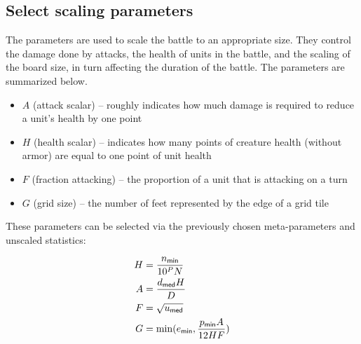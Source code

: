 \subsection{Select scaling parameters}

The parameters are used to scale the battle to an appropriate size.
They control the damage done by attacks,
the health of units in the battle,
and the scaling of the board size,
in turn affecting the duration of the battle.
The parameters are summarized below.

\begin{itemize}
    \item $A$ (attack scalar) -- roughly indicates how much damage is required to reduce a unit's health by one point
    \item $H$ (health scalar) -- indicates how many points of creature health (without armor) are equal to one point of unit health
    \item $F$ (fraction attacking) -- the proportion of a unit that is attacking on a turn
    \item $G$ (grid size) -- the number of feet represented by the edge of a grid tile
\end{itemize}

These parameters can be selected via the previously chosen meta-parameters and unscaled statistics:

\begin{align*}
    H &= \frac{n_{\textsf{min}}}{10^P N} \\
    A &= \frac{d_{\textsf{med}} H}{D} \\
    F &= \sqrt{u_{\textsf{med}}} \\
    G &= \min(e_{\textsf{min}}, \frac{p_{\textsf{min}} A}{12 H F})
\end{align*}


